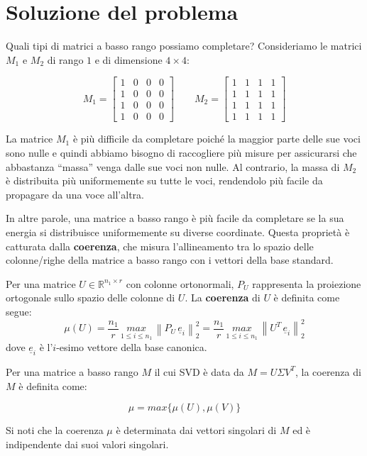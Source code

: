 \documentclass[12pt,a4paper]{report}
\newcommand{\normtwo}[1]{\left\lVert#1\right\rVert _2^2}
\begin{document}
\section{Soluzione del problema}

Quali tipi di matrici a basso rango possiamo completare?
Consideriamo le matrici $M_1$ e $M_2$ di rango $1$ e di dimensione $4 \times 4$:

$$M_1 = \begin{bmatrix}
  1 & 0 & 0 & 0 \\ 1 & 0 & 0 & 0 \\ 1 & 0 & 0 & 0 \\ 1 & 0 & 0 & 0
\end{bmatrix}
\qquad
M_2 = \begin{bmatrix}
  1 & 1 & 1 & 1 \\ 1 & 1 & 1 & 1 \\ 1 & 1 & 1 & 1 \\ 1 & 1 & 1 & 1
\end{bmatrix}$$

La matrice $M_1$ è più difficile da completare
poiché la maggior parte delle sue voci sono nulle
e quindi abbiamo bisogno di raccogliere più misure per assicurarsi
che abbastanza ``massa'' venga dalle sue voci non nulle.
Al contrario, la massa di $M_2$ è distribuita più uniformemente su tutte le voci,
rendendolo più facile da propagare da una voce all'altra.

In altre parole, una matrice a basso rango è più facile da completare se la sua energia
si distribuisce uniformemente su diverse coordinate.
Questa proprietà è catturata dalla \textbf{coerenza}, che misura l'allineamento
tra lo spazio delle colonne/righe della matrice a basso rango con i vettori della base standard.

Per una matrice $U\in\mathbb{R}^{n_1\times r}$ con colonne ortonormali,
$P_U$ rappresenta la proiezione ortogonale sullo spazio delle colonne di $U$.
La \textbf{coerenza} di $U$ è definita come segue:
$$ \mu(U) = \frac{n_1}{r}\, \underset{1 \leq i \leq n_1}{max}\, \normtwo{P_U\, \underline{e}_i}
= \frac{n_1}{r}\, \underset{1 \leq i \leq n_1}{max}\, \normtwo{U^T\, \underline{e}_i}$$
dove $\underline{e}_i$ è l'$i$-esimo vettore della base canonica.

Per una matrice a basso rango $M$ il cui SVD è data da $M=U\Sigma V^T$,
la coerenza di $M$ è definita come:

$$ \mu = max\{\mu(U), \mu(V)\} $$

Si noti che la coerenza $\mu$ è determinata dai vettori singolari di $M$ ed
è indipendente dai suoi valori singolari.
\end{document}
